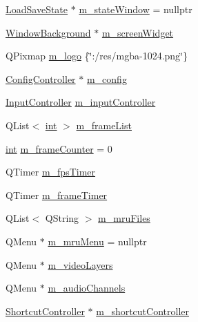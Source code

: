 \begin{DoxyCompactItemize}
\mbox{\hyperlink{class_q_g_b_a_1_1_load_save_state}{Load\+Save\+State}} $\ast$ \mbox{\hyperlink{class_q_g_b_a_1_1_window_a3c3c809993c5b4c43812f5def008ee87}{m\+\_\+state\+Window}} = nullptr
\item 
\mbox{\hyperlink{class_q_g_b_a_1_1_window_background}{Window\+Background}} $\ast$ \mbox{\hyperlink{class_q_g_b_a_1_1_window_a1b43fd0268b789fe1c13a56eaf7d83b2}{m\+\_\+screen\+Widget}}
\item 
Q\+Pixmap \mbox{\hyperlink{class_q_g_b_a_1_1_window_a416282661e51f8eb5fbf78605363fd7e}{m\+\_\+logo}} \{\char`\"{}\+:/res/mgba-\/1024.png\char`\"{}\}
\item 
\mbox{\hyperlink{class_q_g_b_a_1_1_config_controller}{Config\+Controller}} $\ast$ \mbox{\hyperlink{class_q_g_b_a_1_1_window_a1fffd74a780b91ade97a790696f83bf4}{m\+\_\+config}}
\item 
\mbox{\hyperlink{class_q_g_b_a_1_1_input_controller}{Input\+Controller}} \mbox{\hyperlink{class_q_g_b_a_1_1_window_a0dea4f9d242c46f2594cb7937149438e}{m\+\_\+input\+Controller}}
\item 
Q\+List$<$ \mbox{\hyperlink{ioapi_8h_a787fa3cf048117ba7123753c1e74fcd6}{int}} $>$ \mbox{\hyperlink{class_q_g_b_a_1_1_window_a15295234e658264f96c4e7fde309c42f}{m\+\_\+frame\+List}}
\item 
\mbox{\hyperlink{ioapi_8h_a787fa3cf048117ba7123753c1e74fcd6}{int}} \mbox{\hyperlink{class_q_g_b_a_1_1_window_aa0d25cd1e37fca324aec9229f9bf70ad}{m\+\_\+frame\+Counter}} = 0
\item 
Q\+Timer \mbox{\hyperlink{class_q_g_b_a_1_1_window_a9f14fb090e768c6596e9eec17397c78c}{m\+\_\+fps\+Timer}}
\item 
Q\+Timer \mbox{\hyperlink{class_q_g_b_a_1_1_window_af41a8c12f4cb3b66fb01dcc264fcdfbf}{m\+\_\+frame\+Timer}}
\item 
Q\+List$<$ Q\+String $>$ \mbox{\hyperlink{class_q_g_b_a_1_1_window_a969c2c7df3285b9f61bc5589b173cc47}{m\+\_\+mru\+Files}}
\item 
Q\+Menu $\ast$ \mbox{\hyperlink{class_q_g_b_a_1_1_window_a56072e6e9316a908a98d1702faef5b4b}{m\+\_\+mru\+Menu}} = nullptr
\item 
Q\+Menu $\ast$ \mbox{\hyperlink{class_q_g_b_a_1_1_window_a06d96a244f6d47f78774c88eb6fa3189}{m\+\_\+video\+Layers}}
\item 
Q\+Menu $\ast$ \mbox{\hyperlink{class_q_g_b_a_1_1_window_afbcc6ca010320d87082d59cd47796ce3}{m\+\_\+audio\+Channels}}
\item 
\mbox{\hyperlink{class_q_g_b_a_1_1_shortcut_controller}{Shortcut\+Controller}} $\ast$ \mbox{\hyperlink{class_q_g_b_a_1_1_window_a17bf7561716a90dab11e3bc538e1e089}{m\+\_\+shortcut\+Controller}}

\end{DoxyCompactItemize}
